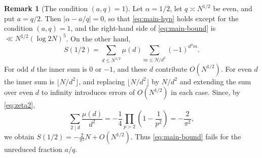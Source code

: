 \documentclass[11pt]{amsart}
\numberwithin{equation}{section}
\numberwithin{figure}{section}
\theoremstyle{definition}
\newtheorem{remark}{Remark}[section]
\begin{document}
\begin{remark}[The condition $(a,q)=1$]\label{rem:coprime}
Let $\alpha=1/2$, let $q\asymp N^{1/2}$ be even, and put $a=q/2$.  Then
$|\alpha-a/q|=0$, so that \eqref{eq:main-hyp} holds except for the
condition $(a,q)=1$, and the right-hand side of \eqref{eq:main-bound} is
$\ll N^{1/2}(\log 2N)^5$.  On the other hand,
\[
  S(1/2)=\sum_{d\le N^{1/2}}\mu(d)\sum_{m\le N/d^2}(-1)^{d^2m}.
\]
For odd $d$ the inner sum is $0$ or $-1$, and these $d$ contribute
$O(N^{1/2})$.  For even $d$ the inner sum is $\lfloor N/d^2\rfloor$, and
replacing $\lfloor N/d^2\rfloor$ by $N/d^2$ and extending the sum over
even $d$ to infinity introduces errors of $O(N^{1/2})$ in each case.
Since, by \eqref{eq:zeta2},
\[
  \sum_{2\mid d}\frac{\mu(d)}{d^2}
  =-\frac14\prod_{p>2}\left(1-\frac1{p^2}\right)=-\frac2{\pi^2},
\]
we obtain $S(1/2)=-\frac2{\pi^2}N+O(N^{1/2})$.  Thus
\eqref{eq:main-bound} fails for the unreduced fraction $a/q$.
\end{remark}
\end{document}
